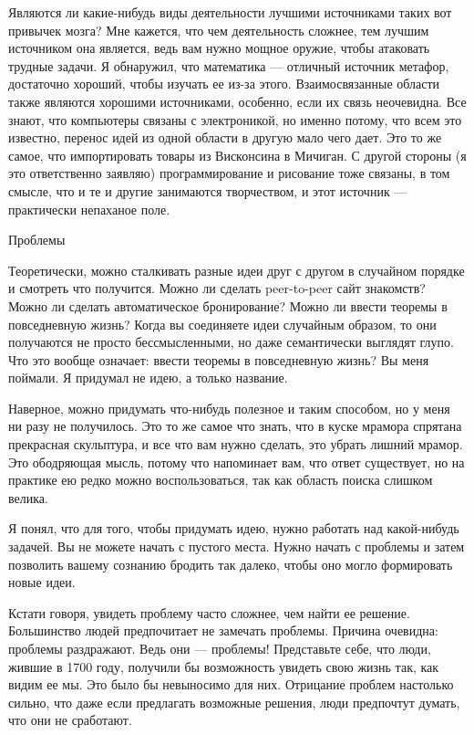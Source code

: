 \documentclass[ebook,12pt,oneside,openany]{memoir}
\begin{document}
Являются ли какие-нибудь виды деятельности лучшими источниками таких
вот привычек мозга? Мне кажется, что чем деятельность сложнее, тем
лучшим источником она является, ведь вам нужно мощное оружие, чтобы
атаковать трудные задачи. Я обнаружил, что математика — отличный
источник метафор, достаточно хороший, чтобы изучать ее из-за этого.
Взаимосвязанные области также являются хорошими источниками, особенно,
если их связь неочевидна. Все знают, что компьютеры связаны с
электроникой, но именно потому, что всем это известно, перенос идей из
одной области в другую мало чего дает. Это то же самое, что
импортировать товары из Висконсина в Мичиган. С другой стороны (я это
ответственно заявляю) программирование и рисование тоже связаны, в том
смысле, что и те и другие занимаются творчеством, и этот источник —
практически непаханое поле.

Проблемы

Теоретически, можно сталкивать разные идеи друг с другом в случайном
порядке и смотреть что получится. Можно ли сделать peer-to-peer сайт
знакомств? Можно ли сделать автоматическое бронирование? Можно ли
ввести теоремы в повседневную жизнь? Когда вы соединяете идеи
случайным образом, то они получаются не просто бессмысленными, но даже
семантически выглядят глупо. Что это вообще означает: ввести теоремы в
повседневную жизнь? Вы меня поймали. Я придумал не идею, а только
название.

Наверное, можно придумать что-нибудь полезное и таким способом, но у
меня ни разу не получилось. Это то же самое что знать, что в куске
мрамора спрятана прекрасная скульптура, и все что вам нужно сделать,
это убрать лишний мрамор. Это ободряющая мысль, потому что напоминает
вам, что ответ существует, но на практике ею редко можно
воспользоваться, так как область поиска слишком велика.

Я понял, что для того, чтобы придумать идею, нужно работать над
какой-нибудь задачей. Вы не можете начать с пустого места. Нужно
начать с проблемы и затем позволить вашему сознанию бродить так
далеко, чтобы оно могло формировать новые идеи.

Кстати говоря, увидеть проблему часто сложнее, чем найти ее решение.
Большинство людей предпочитает не замечать проблемы. Причина очевидна:
проблемы раздражают. Ведь они — проблемы! Представьте себе, что люди,
жившие в 1700 году, получили бы возможность увидеть свою жизнь так,
как видим ее мы. Это было бы невыносимо для них. Отрицание проблем
настолько сильно, что даже если предлагать возможные решения, люди
предпочтут думать, что они не сработают.
\end{document}
